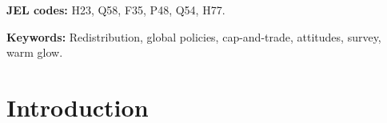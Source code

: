 \documentclass[12pt,english]{article}
\begin{document}
\medskip
\noindent \textbf{JEL codes:} H23, Q58, F35, P48, Q54, H77. %

\noindent \textbf{Keywords:} Redistribution, global policies, cap-and-trade, attitudes, survey, warm glow.%

\clearpage

\onehalfspacing %


\section{Introduction}\label{sec:intro}%
\end{document}
